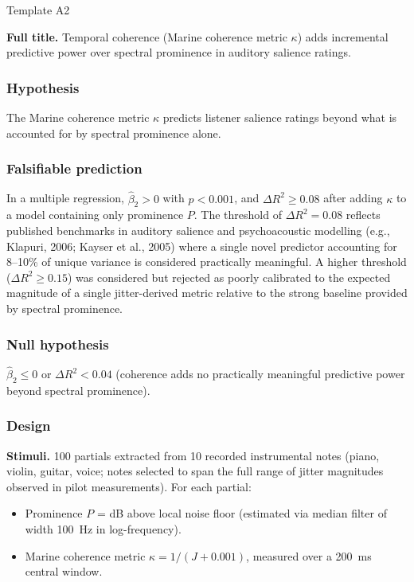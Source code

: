 \documentclass[11pt, a4paper]{article}
\begin{document}
\begin{predbox}{Template A2}

\textbf{Full title.}
Temporal coherence (Marine coherence metric $\kappa$) adds incremental predictive
power over spectral prominence in auditory salience ratings.

\subsubsection{Hypothesis}

The Marine coherence metric $\kappa$ predicts listener salience ratings beyond
what is accounted for by spectral prominence alone.

\subsubsection{Falsifiable prediction}

In a multiple regression, $\hat{\beta}_2 > 0$ with $p < 0.001$, and
$\Delta R^2 \geq 0.08$ after adding $\kappa$ to a model containing only
prominence $P$.  The threshold of $\Delta R^2 = 0.08$ reflects published
benchmarks in auditory salience and psychoacoustic modelling (e.g., Klapuri,
2006; Kayser et al., 2005) where a single novel predictor accounting for
8–10\% of unique variance is considered practically meaningful.  A higher
threshold ($\Delta R^2 \geq 0.15$) was considered but rejected as poorly
calibrated to the expected magnitude of a single jitter-derived metric relative
to the strong baseline provided by spectral prominence.

\subsubsection{Null hypothesis}

$\hat{\beta}_2 \leq 0$ or $\Delta R^2 < 0.04$ (coherence adds no practically
meaningful predictive power beyond spectral prominence).

\subsubsection{Design}

\textbf{Stimuli.}
100 partials extracted from 10 recorded instrumental notes (piano, violin, guitar,
voice; notes selected to span the full range of jitter magnitudes observed in
pilot measurements).  For each partial:
\begin{itemize}
  \item Prominence $P$ = dB above local noise floor (estimated via median filter
    of width 100~Hz in log-frequency).
  \item Marine coherence metric $\kappa = 1 / (J + 0.001)$, measured over a
    200~ms central window.
\end{itemize}


\end{predbox}
\end{document}
